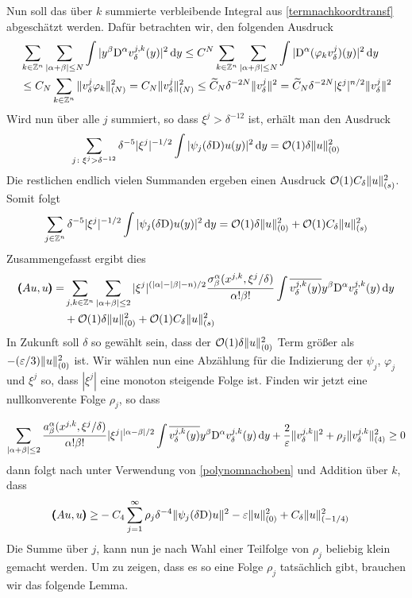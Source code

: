 Nun soll das über $k$ summierte verbleibende Integral aus \eqref{termnachkoordtransf} abgeschätzt werden. Dafür betrachten wir, den folgenden Ausdruck
\begin{align}
\begin{split}
&\sum_{k\in\mathbb Z^n}\sum_{|\alpha+\beta|\le N} \int|y^\beta\mathrm D^\alpha v^{j,k}_\delta(y)|^2\,\mathrm d y \le C^{N} \sum_{k\in\mathbb Z^n} \sum_{|\alpha+\beta|\le N}\int |\mathrm D^\alpha(\varphi_k v^j_\delta)(y)|^2\,\mathrm d y \\
&\le C_N\sum_{k\in\mathbb Z^n}\| v^j_\delta \varphi_k\|_{(N)}^2 
= C_N\| v^j_\delta \|_{(N)}^2 \nonumber
\le \widetilde C_N \delta^{-2N}\| v^j_\delta \|^2 = \widetilde C_N \delta^{-2N}|\xi^j|^{n/2}\| v^j_\delta \|^2 \label{polynomnachoben}
\end{split}
\end{align}
Wird nun über alle $j$ summiert, so dass $\xi^j>\delta^{-12}$ ist, erhält man den Ausdruck
\begin{align}
\sum_{j\colon \xi^j>\delta^{-12}} \delta^{-5} |\xi^j|^{-1/2}\int |\psi_j(\delta\mathrm D)u(y)|^2\,\mathrm d y = \mathcal O(1)\delta\lVert u\rVert _{(0)}^2
\end{align}
Die restlichen endlich vielen Summanden ergeben einen Ausdruck $\mathcal O(1)C_\delta \lVert u\rVert _{(s)}^2$. Somit folgt
\begin{align}
\sum_{j\in\mathbb Z^n}\delta^{-5} |\xi^j|^{-1/2}\int |\psi_j(\delta\mathrm D)u(y)|^2\,\mathrm d y = \mathcal O(1)\delta\lVert u\rVert _{(0)}^2 + \mathcal O(1)C_\delta \lVert u\rVert _{(s)}^2
\end{align}
Zusammengefasst ergibt dies
\begin{align}
\pmb(Au,u\pmb)
=& \sum_{j,k\in\mathbb Z^n}\sum_{\lvert\alpha+\beta\rvert\le 2}|\xi^j|^{(\lvert\alpha\rvert-\lvert\beta\rvert-n)/2} \frac{\sigma^\alpha_\beta(x^{j,k},\xi^j/\delta)}{\alpha!\beta!}\int\overline{v^{j,k}_\delta(y)}y^\beta\mathrm D^\alpha v^{j,k}_\delta(y)\,\mathrm d y\\
&+\mathcal O(1)\delta\lVert u\rVert _{(0)}^2 + \mathcal O(1)C_\delta \lVert u\rVert _{(s)}^2\nonumber
\end{align}
In Zukunft soll $\delta$ so gewählt sein, dass der $\mathcal O(1)\delta\lVert u\rVert ^2_{(0)}$ Term größer als $-(\varepsilon/3)\lVert u\rVert ^2_{(0)}$ ist. Wir wählen nun eine Abzählung für die Indizierung der $\psi_j$, $\varphi_j$ und $\xi^j$ so, dass $|\xi^j|$ eine monoton steigende Folge ist. Finden wir jetzt eine nullkonverente Folge $\rho_j$, so dass

\begin{align}
\sum_{|\alpha+\beta|\le 2} \frac{a^\alpha_\beta(x^{j,k},\xi^j/\delta)}{\alpha!\beta!}|\xi^j|^{|\alpha-\beta|/2}\int \overline{v^{j,k}_\delta(y)}y^\beta\mathrm D^\alpha v^{j,k}_\delta(y)\,\mathrm d y + \frac{2}{\varepsilon}\lVert v^{j,k}_\delta\rVert^2 + \rho_j \lVert v^{j,k}_\delta\rVert_{(4)}^2 \ge 0
\end{align}
dann folgt nach unter Verwendung von \eqref{polynomnachoben} und Addition über $k$,  dass 
\begin{align}
\pmb(Au,u\pmb)
\ge& -C_4\sum_{j=1}^\infty \rho_j \delta^{-4}\lVert\psi_j(\delta\mathrm D)u\rVert^2 - \varepsilon \lVert u\rVert _{(0)}^2 + C_\delta \lVert u\rVert _{(-1/4)}^2\nonumber
\end{align}
Die Summe über $j$, kann nun je nach Wahl einer Teilfolge von $\rho_j$ beliebig klein gemacht werden. Um zu zeigen, dass es so eine Folge $\rho_j$ tatsächlich gibt, brauchen wir das folgende Lemma.

